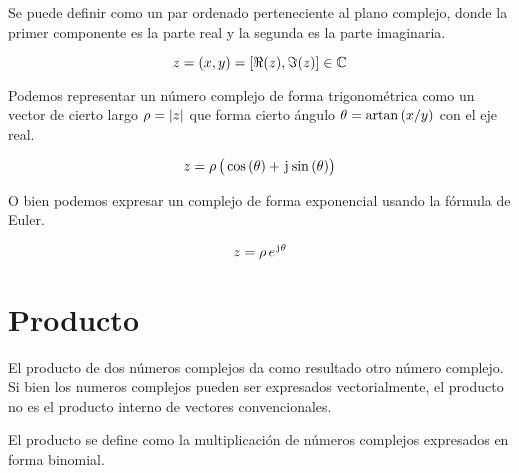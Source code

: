 Se puede definir como un par ordenado perteneciente al plano complejo, donde la primer componente es la parte real y la segunda es la parte imaginaria.

\begin{mdframed}[style=DefinitionFrame]
    \begin{defn}
        \label{defn:VectorForm}
    \end{defn}
    \begin{equation*}
        z = (x,y) = \left[\Re(z),\Im(z)\right] \in \mathbb{C}
    \end{equation*}
\end{mdframed}

Podemos representar un número complejo de forma trigonométrica como un vector de cierto largo $\rho={\left| {z} \right|}$ que forma cierto ángulo $\theta = \operatorname{artan}{(x/y)}$ con el eje real.

\begin{mdframed}[style=DefinitionFrame]
    \begin{defn}
        \label{defn:TrigForm}
    \end{defn}
    \begin{equation*}
        z = \rho \, \big( \cos{(\theta)} + \mkern2mu\mathrm{j}\mkern1mu \sin{(\theta)} \big)
    \end{equation*}
\end{mdframed}

O bien podemos expresar un complejo de forma exponencial usando la fórmula de Euler.

\begin{mdframed}[style=DefinitionFrame]
    \begin{defn}
        \label{defn:ExpForm}
    \end{defn}
    \begin{equation*}
        z = \rho \, e^{\mkern2mu\mathrm{j}\mkern1mu \theta}
    \end{equation*}
\end{mdframed}


\section{Producto}

El producto de dos números complejos da como resultado otro número complejo.
Si bien los numeros complejos pueden ser expresados vectorialmente, el producto no es el producto interno de vectores convencionales.

El producto se define como la multiplicación de números complejos expresados en forma binomial.

